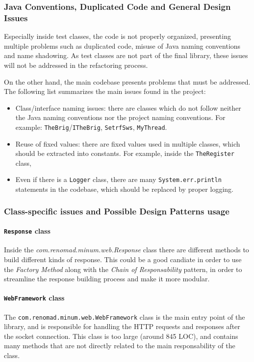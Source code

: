 \subsubsection{Java Conventions, Duplicated Code and General Design Issues}

Especially inside test classes, the code is not properly organized, presenting multiple problems such as duplicated code, misuse of Java naming conventions and name shadowing. As test classes are not part of the final library, these issues will not be addressed in the refactoring process.

On the other hand, the main codebase presents problems that must be addressed. The following list summarizes the main issues found in the project:

\begin{itemize}
	\item Class/interface naming issues: there are classes which do not follow neither the Java naming conventions nor the project naming conventions. For example: \texttt{TheBrig}/\texttt{ITheBrig}, \texttt{SetrfSws}, \texttt{MyThread}.
	\item Reuse of fixed values: there are fixed values used in multiple classes, which should be extracted into constants. For example, inside the \texttt{TheRegister} class,
	\item Even if there is a \texttt{Logger} class, there are many \texttt{System.err.println} statements in the codebase, which should be replaced by proper logging.
\end{itemize}

\subsubsection{Class-specific issues and Possible Design Patterns usage}

\paragraph*{\texttt{Response} class} Inside the \textit{com.renomad.minum.web.Response} class there are different methods to build different kinds of response. This could be a good candiate in order to use the \textit{Factory Method} along with the \textit{Chain of Responsability} pattern, in order to streamline the response building process and make it more modular.

\paragraph*{\texttt{WebFramework} class} The \texttt{com.renomad.minum.web.WebFramework} class is the main entry point of the library, and is responsible for handling the HTTP requests and responses after the socket connection. This class is too large (around 845 LOC), and contains many methods that are not directly related to the main responsability of the class.

